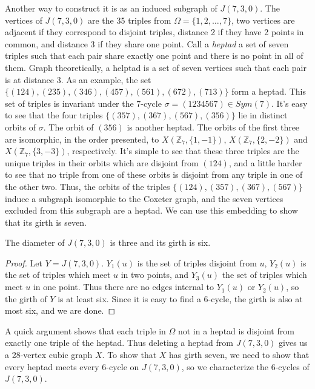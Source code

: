 Another way to construct it is as an induced subgraph of $J(7,3,0)$.  The vertices of $J(7,3,0)$ are the 35 triples from $\Omega=\{1,2,\dots,7\}$, two vertices are adjacent if they correspond to disjoint triples, distance 2 if they have 2 points in common, and distance 3 if they share one point.  Call a \textit{heptad} a set of seven triples such that each pair share exactly one point and there is no point in all of them.  Graph theoretically, a helptad is a set of seven vertices such that each pair is at distance 3.  As an example, the set $\{(124),(235),(346),(457),(561),(672),(713)\}$ form a heptad.  This set of triples is invariant under the 7-cycle $\sigma=(1234567)\in Sym(7)$.  It's easy to see that the four triples $\{(357),(367),(567),(356)\}$ lie in distinct orbits of $\sigma$.  The orbit of $(356)$ is another heptad.  The orbits of the first three are isomorphic, in the order presented, to $X(\mathbb{Z}_7,\{1,-1\})$, $X(\mathbb{Z}_7,\{2,-2\})$ and $X(\mathbb{Z}_7,\{3,-3\})$, respectively.  It's simple to see that these three triples are the unique triples in their orbits which are disjoint from $(124)$, and a little harder to see that no triple from one of these orbits is disjoint from any triple in one of the other two.  Thus, the orbits of the triples $\{(124),(357),(367),(567)\}$ induce a subgraph isomorphic to the Coxeter graph, and the seven vertices excluded from this subgraph are a heptad.  We can use this embedding to show that its girth is seven.

\begin{lemma}
	The diameter of $J(7,3,0)$ is three and its girth is six.
\end{lemma}
\begin{proof}
	Let $Y=J(7,3,0)$.  $Y_1(u)$ is the set of triples disjoint from $u$, $Y_2(u)$ is the set of triples which meet $u$ in two points, and $Y_3(u)$ the set of triples which meet $u$ in one point.  Thus there are no edges internal to $Y_1(u)$ or $Y_2(u)$, so the girth of $Y$ is at least six.  Since it is easy to find a 6-cycle, the girth is also at most six, and we are done.
	
	
	
\end{proof}

A quick argument shows that each triple in $\Omega$ not in a heptad is disjoint from exactly one triple of the heptad.  Thus deleting a heptad from $J(7,3,0)$ gives us a 28-vertex cubic graph $X$.  To show that $X$ has girth seven, we need to show that every heptad meets every 6-cycle on $J(7,3,0)$, so we characterize the 6-cycles of $J(7,3,0)$.

